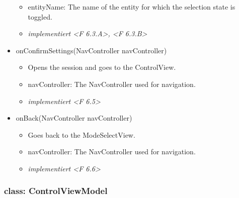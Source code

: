 \documentclass[oneside, ngerman]{sdqtechreport}
\begin{document}
\begin{itemize}
\begin{itemize}
            \item entityName: The name of the entity for which the selection state is toggled.
            \item \textit{implementiert <F 6.3.A>, <F 6.3.B>}
        \end{itemize}
    \item onConfirmSettings(NavController navController)
        \begin{itemize}
            \item Opens the session and goes to the ControlView.
            \item navController: The NavController used for navigation.
            \item \textit{implementiert <F 6.5>}
        \end{itemize}
    \item onBack(NavController navController)
        \begin{itemize}
            \item Goes back to the ModeSelectView.
            \item navController: The NavController used for navigation.
            \item \textit{implementiert <F 6.6>}
        \end{itemize}
\end{itemize}



\subsubsection{class: ControlViewModel}
\end{document}
